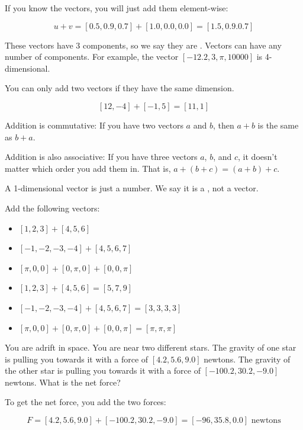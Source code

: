 If you know the vectors, you will just add them element-wise:

$$ u + v = [0.5, 0.9, 0.7] + [1.0, 0.0, 0.0] = [1.5, 0.9. 0.7] $$

These vectors have 3 components, so we say they are . 
Vectors can have any number of components. For example, the vector
 $[-12.2, 3, \pi, 10000]$ is 4-dimensional.

 You can only add two vectors if they have the same dimension.

 $$ [12, -4] + [-1, 5] = [11,1] $$

 Addition is commutative: If you have two vectors $a$ and $b$, then
 $a + b$ is the same as $b + a$.

 Addition is also associative: If you have three vectors $a$, $b$, and $c$,
 it doesn't matter which order you add them in. 
 That is, $a + (b + c) = (a + b) + c$.

 A 1-dimensional vector is just a number. We say it is a 
 , not a vector.

 \begin{Exercise}[title={Adding vectors}, label=adding_vectors]
Add the following vectors:
\begin{itemize}
    \item $[1, 2, 3] + [4, 5, 6]$
    \item $[-1, -2, -3, -4] + [4, 5, 6, 7]$
    \item $[\pi, 0, 0] + [0, \pi, 0] + [0, 0, \pi]$
\end{itemize}
\end{Exercise}
\begin{Answer}[ref=adding_vectors]
    \begin{itemize}
        \item $[1, 2, 3] + [4, 5, 6] = [5, 7, 9]$
        \item $[-1, -2, -3, -4] + [4, 5, 6, 7] = [3, 3, 3, 3]$
        \item $[\pi, 0, 0] + [0, \pi, 0] + [0, 0, \pi] = [\pi, \pi, \pi]$ 
    \end{itemize}
\end{Answer}

    \begin{Exercise}[title={Adding Forces}, label=adding_forces]
        You are adrift in space. You are near two different stars. 
        The gravity of one star is pulling you towards it with a 
        force of $[4.2, 5.6, 9.0]$ newtons.
        The gravity of the other star is pulling you towards it with
        a force of $[-100.2, 30.2, -9.0]$ newtons. What is the net force?
        \end{Exercise}
        \begin{Answer}[ref=adding_forces]
            To get the net force, you add the two forces:

            $$F = [4.2, 5.6, 9.0] + [-100.2, 30.2, -9.0] = [-96, 35.8, 0.0] \text{ newtons}$$
   
\end{Answer}

